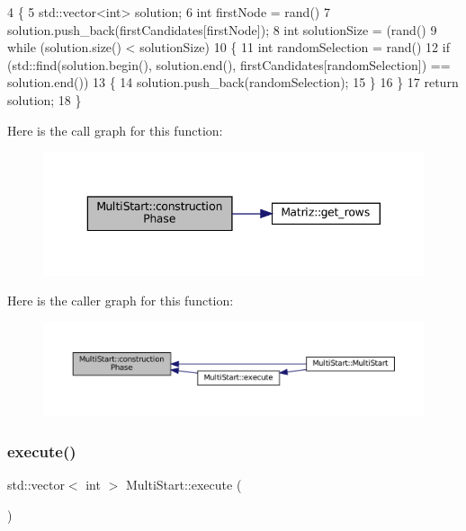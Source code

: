 \begin{DoxyCode}
4 \{
5   std::vector<int> solution;
6   \textcolor{keywordtype}{int} firstNode = rand() %
7   solution.push\_back(firstCandidates[firstNode]);
8   \textcolor{keywordtype}{int} solutionSize = (rand() %
9   \textcolor{keywordflow}{while} (solution.size() < solutionSize)
10   \{
11     \textcolor{keywordtype}{int} randomSelection = rand() %
12     \textcolor{keywordflow}{if} (std::find(solution.begin(), solution.end(), firstCandidates[randomSelection]) == solution.end())
13     \{
14       solution.push\_back(randomSelection);
15     \}
16   \}
17   \textcolor{keywordflow}{return} solution;
18 \}
\end{DoxyCode}
Here is the call graph for this function\+:
\nopagebreak
\begin{figure}[H]
\begin{center}
\leavevmode
\includegraphics[width=343pt]{classMultiStart_a29c5796648ede3e6c7fe8ca8043f8187_cgraph}
\end{center}
\end{figure}
Here is the caller graph for this function\+:
\nopagebreak
\begin{figure}[H]
\begin{center}
\leavevmode
\includegraphics[width=350pt]{classMultiStart_a29c5796648ede3e6c7fe8ca8043f8187_icgraph}
\end{center}
\end{figure}
\mbox{\label{classMultiStart_a9d842b1f602c4b8a47bf6d88d483ccae}} 
\subsubsection{\texorpdfstring{execute()}{execute()}}
{\footnotesize\ttfamily std\+::vector$<$ int $>$ Multi\+Start\+::execute (\begin{DoxyParamCaption}{ }\end{DoxyParamCaption})\hspace{0.3cm}{\ttfamily [virtual]}}



